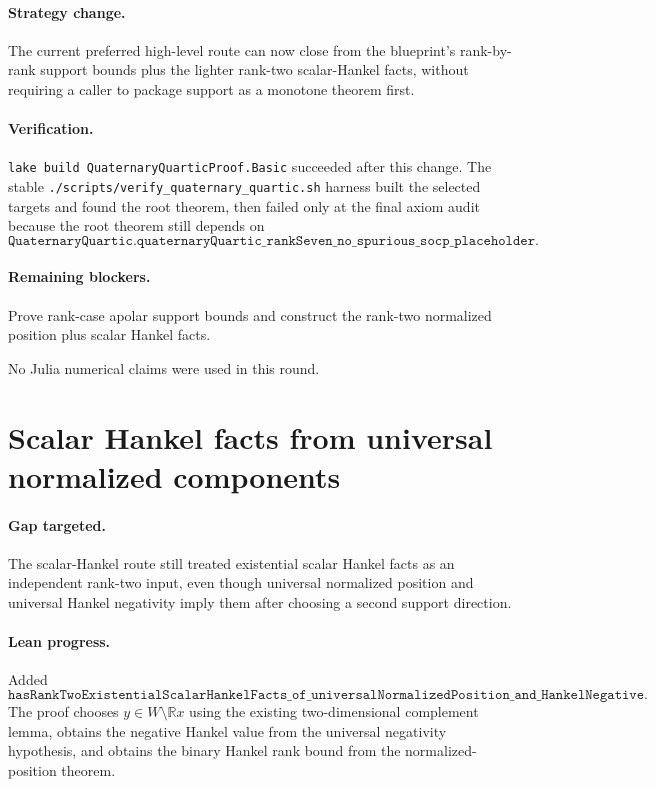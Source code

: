 \documentclass[11pt]{article}
\begin{document}
\paragraph{Strategy change.}
The current preferred high-level route can now close from the blueprint's
rank-by-rank support bounds plus the lighter rank-two scalar-Hankel facts,
without requiring a caller to package support as a monotone theorem first.

\paragraph{Verification.}
\texttt{lake build QuaternaryQuarticProof.Basic} succeeded after this change.
The stable \texttt{./scripts/verify\_quaternary\_quartic.sh} harness built the
selected targets and found the root theorem, then failed only at the final axiom
audit because the root theorem still depends on
\[
\texttt{QuaternaryQuartic.quaternaryQuartic\_rankSeven\_no\_spurious\_socp\_placeholder}.
\]

\paragraph{Remaining blockers.}
Prove rank-case apolar support bounds and construct the rank-two normalized
position plus scalar Hankel facts.

No Julia numerical claims were used in this round.

\section*{Scalar Hankel facts from universal normalized components}

\paragraph{Gap targeted.}
The scalar-Hankel route still treated existential scalar Hankel facts as an
independent rank-two input, even though universal normalized position and
universal Hankel negativity imply them after choosing a second support
direction.

\paragraph{Lean progress.}
Added
\[
\texttt{hasRankTwoExistentialScalarHankelFacts\_of\_universalNormalizedPosition\_and\_HankelNegative}.
\]
The proof chooses \(y\in W\setminus \mathbb{R}x\) using the existing
two-dimensional complement lemma, obtains the negative Hankel value from the
universal negativity hypothesis, and obtains the binary Hankel rank bound from
the normalized-position theorem.
\end{document}
